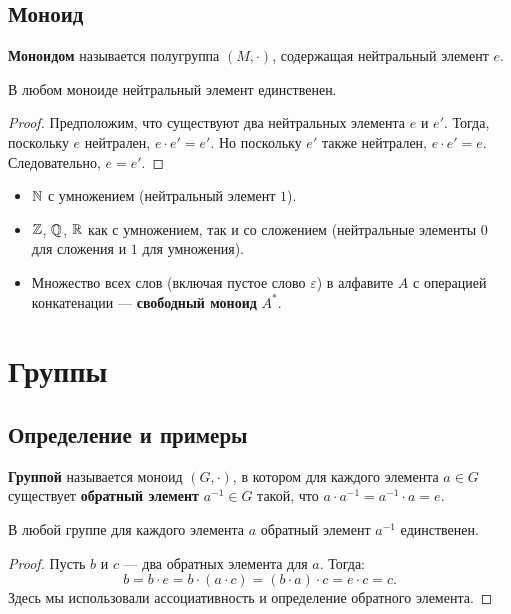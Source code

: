 \documentclass[10pt]{article}
\begin{document}
\subsection{Моноид}
\begin{definition}
\textbf{Моноидом} называется полугруппа $(M, \cdot)$, содержащая нейтральный элемент $e$.
\end{definition}

\begin{stat}
В любом моноиде нейтральный элемент единственен.
\end{stat}
\begin{proof}
Предположим, что существуют два нейтральных элемента $e$ и $e'$. Тогда, поскольку $e$ нейтрален, $e \cdot e' = e'$. Но поскольку $e'$ также нейтрален, $e \cdot e' = e$. Следовательно, $e = e'$.
\end{proof}

\begin{example}
    \begin{itemize}
        \item $\mathbb{N}$ с умножением (нейтральный элемент $1$).
        \item $\mathbb{Z}$, $\mathbb{Q}$, $\mathbb{R}$ как с умножением, так и со сложением (нейтральные элементы $0$ для сложения и $1$ для умножения).
        \item Множество всех слов (включая пустое слово $\varepsilon$) в алфавите $A$ с операцией конкатенации — \textbf{свободный моноид} $A^*$.
    \end{itemize}
\end{example}

\section{Группы}

\subsection{Определение и примеры}
\begin{definition}
\textbf{Группой} называется моноид $(G, \cdot)$, в котором для каждого элемента $a \in G$ существует \textbf{обратный элемент} $a^{-1} \in G$ такой, что $a \cdot a^{-1} = a^{-1} \cdot a = e$.
\end{definition}

\begin{stat}
В любой группе для каждого элемента $a$ обратный элемент $a^{-1}$ единственен.
\end{stat}
\begin{proof}
Пусть $b$ и $c$ — два обратных элемента для $a$. Тогда:
$$b = b \cdot e = b \cdot (a \cdot c) = (b \cdot a) \cdot c = e \cdot c = c.$$
Здесь мы использовали ассоциативность и определение обратного элемента.
\end{proof}
\end{document}
